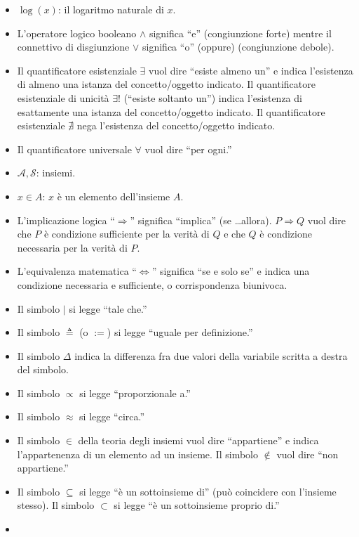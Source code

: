 \documentclass[
  11pt,
]{krantz}
\providecommand{\tightlist}{%
  \setlength{\itemsep}{0pt}\setlength{\parskip}{0pt}}
\theoremstyle{definition}
\theoremstyle{definition}
\theoremstyle{definition}
\theoremstyle{definition}
\theoremstyle{remark}
\begin{document}
\begin{itemize}
\tightlist
\item
  \(\log(x)\): il logaritmo naturale di \(x\).
\item
  L'operatore logico booleano \(\land\) significa ``e'' (congiunzione forte) mentre il connettivo di disgiunzione \(\lor\) significa ``o'' (oppure) (congiunzione debole).
\item
  Il quantificatore esistenziale \(\exists\) vuol dire ``esiste almeno un'' e indica l'esistenza di almeno una istanza del concetto/oggetto indicato. Il quantificatore esistenziale di unicità \(\exists!\) (``esiste soltanto un'') indica l'esistenza di esattamente una istanza del concetto/oggetto indicato. Il quantificatore esistenziale \(\nexists\) nega l'esistenza del concetto/oggetto indicato.
\item
  Il quantificatore universale \(\forall\) vuol dire ``per ogni.''
\item
  \(\mathcal{A, S}\): insiemi.
\item
  \(x \in A\): \(x\) è un elemento dell'insieme \(A\).
\item
  L'implicazione logica ``\(\Rightarrow\)'' significa ``implica'' (se \ldots allora). \(P \Rightarrow Q\) vuol dire che \(P\) è condizione sufficiente per la verità di \(Q\) e che \(Q\) è condizione necessaria per la verità di \(P\).
\item
  L'equivalenza matematica ``\(\iff\)'' significa ``se e solo se'' e indica una condizione necessaria e sufficiente, o corrispondenza biunivoca.
\item
  Il simbolo \(\vert\) si legge ``tale che.''
\item
  Il simbolo \(\triangleq\) (o \(:=\)) si legge ``uguale per definizione.''
\item
  Il simbolo \(\Delta\) indica la differenza fra due valori della variabile scritta a destra del simbolo.
\item
  Il simbolo \(\propto\) si legge ``proporzionale a.''
\item
  Il simbolo \(\approx\) si legge ``circa.''
\item
  Il simbolo \(\in\) della teoria degli insiemi vuol dire ``appartiene'' e indica l'appartenenza di un elemento ad un insieme. Il simbolo \(\notin\) vuol dire ``non appartiene.''
\item
  Il simbolo \(\subseteq\) si legge ``è un sottoinsieme di'' (può coincidere con l'insieme stesso). Il simbolo \(\subset\) si legge ``è un sottoinsieme proprio di.''
\item

\end{itemize}
\end{document}

